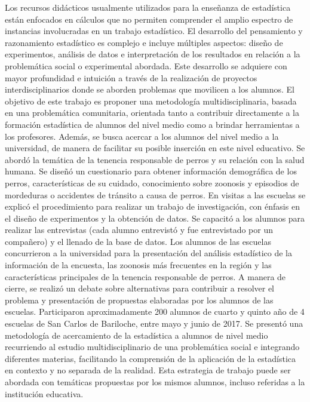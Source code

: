 {Los recursos didácticos usualmente utilizados para la enseñanza de estadística están enfocados en cálculos que no permiten comprender el amplio espectro de instancias involucradas en un trabajo estadístico. El desarrollo del pensamiento y razonamiento estadístico es complejo e incluye múltiples aspectos: diseño de experimentos, análisis de datos e interpretación de los resultados en relación a la problemática social o experimental abordada. Este desarrollo se adquiere con mayor profundidad e intuición a través de la realización de proyectos interdisciplinarios donde se aborden problemas que movilicen a los alumnos. El objetivo de este trabajo es proponer una metodología multidisciplinaria, basada en una problemática comunitaria, orientada tanto a contribuir directamente a la formación estadística de alumnos del nivel medio como a brindar herramientas a los profesores. Además, se busca acercar a los alumnos del nivel medio a la universidad, de manera de facilitar su posible inserción en este nivel educativo. Se abordó la temática de la tenencia responsable de perros y su relación con la salud humana. Se diseñó un cuestionario para obtener información demográfica de los perros, características de su cuidado, conocimiento sobre zoonosis y episodios de mordeduras o accidentes de tránsito a causa de perros. En visitas a las escuelas se explicó el procedimiento para realizar un trabajo de investigación, con énfasis en el diseño de experimentos y la obtención de datos. Se capacitó a los alumnos para realizar las entrevistas (cada alumno entrevistó y fue entrevistado por un compañero) y el llenado de la base de datos. Los alumnos de las escuelas concurrieron a la universidad para la presentación del análisis estadístico de la información de la encuesta, las zoonosis más frecuentes en la región y las características principales de la tenencia responsable de perros. A manera de cierre, se realizó un debate sobre alternativas para contribuir a resolver el problema y presentación de propuestas elaboradas por los alumnos de las escuelas. Participaron aproximadamente 200 alumnos de cuarto y quinto año de 4 escuelas de San Carlos de Bariloche, entre mayo y junio de 2017. Se presentó una metodología de acercamiento de la estadística a alumnos de nivel medio recurriendo al estudio multidisciplinario de una problemática social e integrando diferentes materias, facilitando la comprensión de la aplicación de la estadística en contexto y no separada de la realidad. Esta estrategia de trabajo puede ser abordada con temáticas propuestas por los mismos alumnos, incluso referidas a la institución educativa.}
